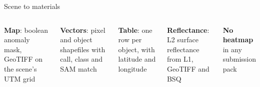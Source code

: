 \documentclass[aspectratio=169,10pt]{beamer}
\begin{document}
\begin{frame}{Scene to materials}
\begin{columns}[T,onlytextwidth]
\par\vspace{0.6mm}
{\fontsize{7}{8.6}\selectfont
\textbf{Map}: boolean anomaly mask, GeoTIFF on the scene's UTM grid\par
\textbf{Vectors}: pixel and object shapefiles with call, class and SAM match\par
\textbf{Table}: one row per object, with latitude and longitude\par
\textbf{Reflectance}: L2 surface reflectance from L1, GeoTIFF and BSQ\par
\textbf{No heatmap} in any submission pack\par}
\end{columns}
\end{frame}
\end{document}
